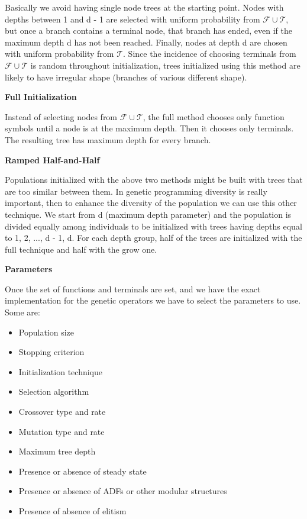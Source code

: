 Basically we avoid having single node trees at the starting point. Nodes with depths between 1 and d - 1 are selected with uniform probability from $\mathcal{F} \cup \mathcal{T}$, but once a branch contains a terminal node, that branch has ended, even if the maximum depth d has not been reached. Finally, nodes at depth d are chosen with uniform probability from $\mathcal{T}$. Since the incidence of choosing terminals from $\mathcal{F} \cup \mathcal{T}$ is random throughout initialization, trees initialized using this method are likely to have irregular shape (branches of various different shape).

\vspace{10pt}

\textbf{Full Initialization}

\vspace{10pt}

Instead of selecting nodes from $\mathcal{F} \cup \mathcal{T}$, the full method chooses only function symbols until a node is at the maximum depth. Then it chooses only terminals. The resulting tree has  maximum depth for every branch. 

\vspace{10pt}

\textbf{Ramped Half-and-Half}

\vspace{10pt}

Populations initialized with the above two methods might be built with trees that are too similar between them. In genetic programming diversity is really important, then to enhance the diversity of the population we can use this other technique. We start from d (maximum depth parameter) and the population is divided equally among individuals to be initialized with trees having depths equal to 1, 2, ..., d - 1, d. For each depth group, half of the trees are initialized with the full technique and half with the grow one.  

\vspace{10pt}

\textbf{Parameters}

\vspace{10pt}

Once the set of functions and terminals are set, and we have the exact implementation for the genetic operators we have to select the parameters to use. Some are:

\begin{itemize}
    \item Population size
    \item Stopping criterion
    \item Initialization technique
    \item Selection algorithm
    \item Crossover type and rate
    \item Mutation type and rate
    \item Maximum tree depth
    \item Presence or absence of steady state
    \item Presence or absence of ADFs or other modular structures
    \item Presence of absence of elitism
\end{itemize}

